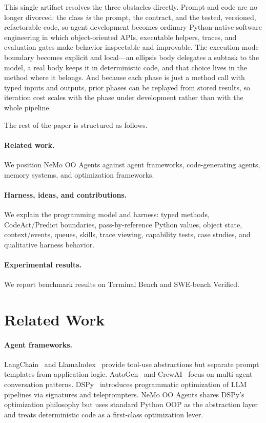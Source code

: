 \documentclass[11pt, logo, onecolumn, copyright, colorlinks=true, allcolors=blue]{nvidiatechreport}
\begin{document}
This single artifact resolves the three obstacles directly. Prompt and code are
no longer divorced: the class \emph{is} the prompt, the contract, and the tested,
versioned, refactorable code, so agent development becomes ordinary Python-native
software engineering in which object-oriented APIs, executable helpers, traces,
and evaluation gates make behavior inspectable and improvable. The execution-mode
boundary becomes explicit and local---an ellipsis body delegates a subtask to the
model, a real body keeps it in deterministic code, and that choice lives in the
method where it belongs. And because each phase is just a method call with typed
inputs and outputs, prior phases can be replayed from stored results, so iteration
cost scales with the phase under development rather than with the whole pipeline.

The rest of the paper is structured as follows.


\paragraph{Related work.} We position NeMo OO Agents against agent frameworks,
code-generating agents, memory systems, and optimization frameworks.

\paragraph{Harness, ideas, and contributions.} We explain the programming model
and harness: typed methods, CodeAct/Predict boundaries, pass-by-reference Python
values, object state, context/events, queues, skills, trace viewing, capability
tests, case studies, and qualitative harness behavior.

\paragraph{Experimental results.} We report benchmark results on
Terminal Bench and SWE-bench Verified.


\section{Related Work}
\label{sec:related}

\paragraph{Agent frameworks.}
LangChain~\cite{langchain2023} and LlamaIndex~\cite{llamaindex2023} provide
tool-use abstractions but separate prompt templates from application logic.
AutoGen~\cite{wu2023autogen} and CrewAI~\cite{crewai2024} focus on multi-agent
conversation patterns. DSPy~\cite{khattab2023dspy} introduces programmatic
optimization of LLM pipelines via signatures and teleprompters. NeMo OO Agents shares
DSPy's optimization philosophy but uses standard Python OOP as the abstraction
layer and treats deterministic code as a first-class optimization lever.
\end{document}
